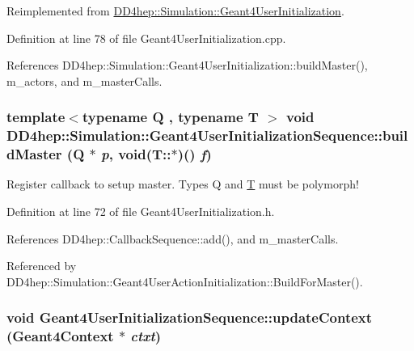 Reimplemented from \hyperlink{class_d_d4hep_1_1_simulation_1_1_geant4_user_initialization_a382bfc9f7dd55d3c0c91f4bfbfefe1d0}{DD4hep::Simulation::Geant4UserInitialization}.

Definition at line 78 of file Geant4UserInitialization.cpp.

References DD4hep::Simulation::Geant4UserInitialization::buildMaster(), m\_\-actors, and m\_\-masterCalls.\hypertarget{class_d_d4hep_1_1_simulation_1_1_geant4_user_initialization_sequence_a7dfd58583e86652aaf675c6db82ff39c}{
\subsubsection[{buildMaster}]{\setlength{\rightskip}{0pt plus 5cm}template$<$typename Q , typename T $>$ void DD4hep::Simulation::Geant4UserInitializationSequence::buildMaster (Q $\ast$ {\em p}, \/  void(T::$\ast$)() {\em f})}}
\label{class_d_d4hep_1_1_simulation_1_1_geant4_user_initialization_sequence_a7dfd58583e86652aaf675c6db82ff39c}


Register callback to setup master. Types Q and \hyperlink{class_t}{T} must be polymorph! 

Definition at line 72 of file Geant4UserInitialization.h.

References DD4hep::CallbackSequence::add(), and m\_\-masterCalls.

Referenced by DD4hep::Simulation::Geant4UserActionInitialization::BuildForMaster().\hypertarget{class_d_d4hep_1_1_simulation_1_1_geant4_user_initialization_sequence_ae73630ce8b3759e3793dc58f585a291b}{
\subsubsection[{updateContext}]{\setlength{\rightskip}{0pt plus 5cm}void Geant4UserInitializationSequence::updateContext ({\bf Geant4Context} $\ast$ {\em ctxt})}}
\label{class_d_d4hep_1_1_simulation_1_1_geant4_user_initialization_sequence_ae73630ce8b3759e3793dc58f585a291b}


